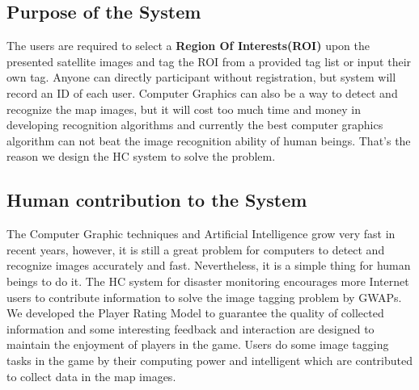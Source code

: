 \subsection{Purpose of the System}
The users are required to select a \textbf{Region Of Interests(ROI)} upon the presented satellite images 
and tag the ROI from a provided tag list or input their own tag. Anyone can directly participant 
without registration, but system will record an ID of each user.
Computer Graphics can also be a way to detect and recognize the map images, but it will cost 
too much time and money in developing recognition algorithms and currently the best 
computer graphics algorithm can not beat the image recognition ability of human beings. 
That's the reason we design the HC system to solve the problem.

\subsection{Human contribution to the System}
The Computer Graphic techniques and Artificial Intelligence grow very fast in recent years, 
however, it is still a great problem for computers to detect and recognize images accurately and fast.
Nevertheless, it is a simple thing for human beings to do it.
The HC system for disaster monitoring encourages more Internet users to contribute information 
to solve the image tagging problem by GWAPs. 
We developed the Player Rating Model to guarantee the quality of collected information 
and some interesting feedback and interaction are designed to maintain the enjoyment of players in the game.
Users do some image tagging tasks in the game by their computing power and intelligent 
which are contributed to collect data in the map images.

